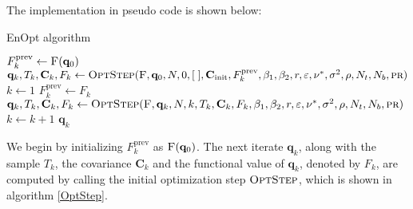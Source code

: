The implementation in pseudo code is shown below:

\begin{algorithm}[H]%
\caption{\label{EnOptAlg}EnOpt algorithm}
\begin{algorithmic}[1]
\State \label{EnOptAlgFOMCall}$F^\mathrm{prev}_{k}\gets \Call{F}{\mathbf{q}_0}$
\State\label{EnOptAlgOptStepCall1} $\mathbf{q}_k,T_k,\mathbf{C}_k,F_k\gets\Call{OptStep}{\textproc{F},\mathbf{q}_0,N,0,[\;],\mathbf{C}_\mathrm{init},F^\mathrm{prev}_{k},\beta_1,\beta_2,r,\varepsilon,\nu^*,\sigma^2,\rho, N_t, N_b, \textproc{pr}}$
\State $k\gets 1$
\label{EnOptAlgBeginWhile}
\State $F^\mathrm{prev}_k\gets F_k$
\State\label{EnOptAlgOptStepCall2} $\mathbf{q}_{k},T_{k},\mathbf{C}_k,F_{k}\gets\Call{OptStep}{\textproc{F},\mathbf{q}_k,N,k,T_k,\mathbf{C}_k,F_k,\beta_1,\beta_2,r,\varepsilon,\nu^*,\sigma^2,\rho, N_t, N_b,\textproc{pr}}$
\State $k\gets k+1$
\EndWhile\label{EnOptAlgEndWhile}
\State \Return $\mathbf{q}_k$
\EndFunction
\end{algorithmic}
\end{algorithm}

We begin by initializing $F^\mathrm{prev}_{k}$ as $\Call{F}{\mathbf{q}_0}$. The next iterate $\mathbf{q}_k$, along with the sample $T_k$, the covariance $\mathbf{C}_k$ and the functional value of $\mathbf{q}_k$, denoted by $F_k$, are computed by calling the initial optimization step $\textproc{OptStep}$, which is shown in algorithm \ref{OptStep}.

